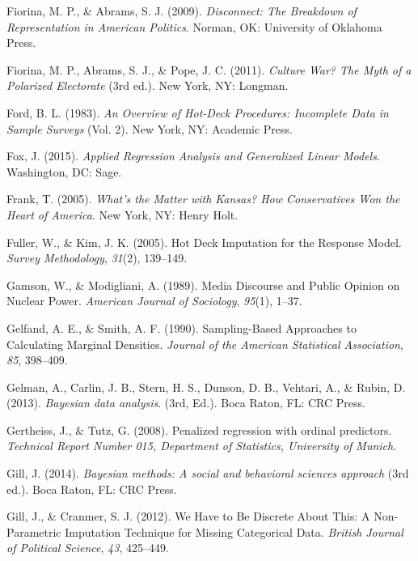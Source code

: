 \documentclass[12pt,econ]{sources/authesis}
\begin{document}
\leavevmode\hypertarget{ref-fiorina_disconnect_2009}{}%
Fiorina, M. P., \& Abrams, S. J. (2009). \emph{Disconnect: The Breakdown of Representation in American Politics}. Norman, OK: University of Oklahoma Press.

\leavevmode\hypertarget{ref-fiorina_culture_2011}{}%
Fiorina, M. P., Abrams, S. J., \& Pope, J. C. (2011). \emph{Culture War? The Myth of a Polarized Electorate} (3rd ed.). New York, NY: Longman.

\leavevmode\hypertarget{ref-ford_1983_overview}{}%
Ford, B. L. (1983). \emph{An Overview of Hot-Deck Procedures: Incomplete Data in Sample Surveys} (Vol. 2). New York, NY: Academic Press.

\leavevmode\hypertarget{ref-fox_applied_2015}{}%
Fox, J. (2015). \emph{Applied Regression Analysis and Generalized Linear Models}. Washington, DC: Sage.

\leavevmode\hypertarget{ref-frank_whats_2005}{}%
Frank, T. (2005). \emph{What's the Matter with Kansas? How Conservatives Won the Heart of America}. New York, NY: Henry Holt.

\leavevmode\hypertarget{ref-fuller_2005_deck}{}%
Fuller, W., \& Kim, J. K. (2005). Hot Deck Imputation for the Response Model. \emph{Survey Methodology}, \emph{31}(2), 139--149.

\leavevmode\hypertarget{ref-gamson_media_1989}{}%
Gamson, W., \& Modigliani, A. (1989). Media Discourse and Public Opinion on Nuclear Power. \emph{American Journal of Sociology}, \emph{95}(1), 1--37.

\leavevmode\hypertarget{ref-gelfand_1990_sampling-based}{}%
Gelfand, A. E., \& Smith, A. F. (1990). Sampling-Based Approaches to Calculating Marginal Densities. \emph{Journal of the American Statistical Association}, \emph{85}, 398--409.

\leavevmode\hypertarget{ref-gelman_2013_bayesian}{}%
Gelman, A., Carlin, J. B., Stern, H. S., Dunson, D. B., Vehtari, A., \& Rubin, D. (2013). \emph{Bayesian data analysis}. (3rd, Ed.). Boca Raton, FL: CRC Press.

\leavevmode\hypertarget{ref-gertheiss_2008_penalized}{}%
Gertheiss, J., \& Tutz, G. (2008). Penalized regression with ordinal predictors. \emph{Technical Report Number 015, Department of Statistics, University of Munich}.

\leavevmode\hypertarget{ref-gill_2014_bayesian}{}%
Gill, J. (2014). \emph{Bayesian methods: A social and behavioral sciences approach} (3rd ed.). Boca Raton, FL: CRC Press.

\leavevmode\hypertarget{ref-gill_2012_have}{}%
Gill, J., \& Cranmer, S. J. (2012). We Have to Be Discrete About This: A Non-Parametric Imputation Technique for Missing Categorical Data. \emph{British Journal of Political Science}, \emph{43}, 425--449.
\end{document}
